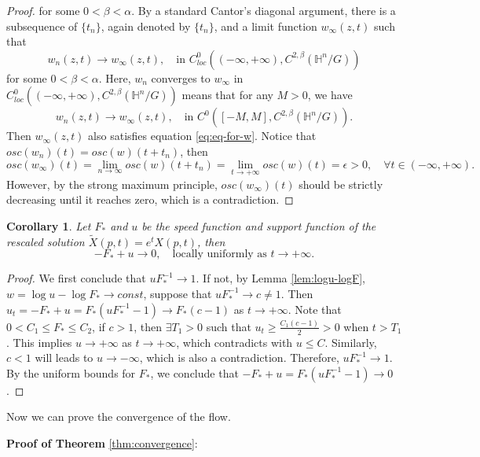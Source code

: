 \documentclass[10pt,a4paper]{amsart}
\newtheorem{corollary}[theorem]{Corollary}
\renewcommand{\H}{{\mathbb{H}}}
\numberwithin{equation}{section}
\begin{document}
\begin{proof}
    for some \(0 < \beta < \alpha\). By a standard Cantor's diagonal argument, there is a subsequence of \(\{t_n\}\), again denoted by \(\{t_n\}\), and a limit function \(w_{\infty}(z,t)\) such that 
    \[ w_n(z,t) \to w_{\infty}(z,t), \quad \text{in }C_{loc}^{0}\left((-\infty,+\infty),C^{2,\beta}(\H^n / G)\right) \]
    for some \(0 < \beta < \alpha\). Here, \(w_n\) converges to \(w_{\infty}\) in \(C_{loc}^{0}\left((-\infty,+\infty),C^{2,\beta}(\H^n / G)\right)\) means that for any \(M > 0\), we have 
    \[ w_n(z,t) \to w_{\infty}(z,t), \quad \text{in }C^{0}\left([-M,M],C^{2,\beta}(\H^n / G)\right). \] 
    Then \(w_\infty(z,t)\) also satisfies equation \eqref{eq:eq-for-w}. Notice that \( osc(w_n)(t) = osc(w)(t+t_n)\), then 
    \[ osc(w_\infty)(t) = \lim_{n\to \infty}osc(w)(t+t_n) = \lim_{t\to +\infty}osc(w)(t) = \epsilon > 0, \quad \forall t\in (-\infty,+\infty). \]
    However, by the strong maximum principle, \(osc(w_\infty)(t)\) should be strictly decreasing until it reaches zero, which is a contradiction. 
\end{proof}


\begin{corollary}
    Let \(F_*\) and \(u\) be the speed function and support function of the rescaled solution \(\tilde{X}(p,t) = e^t X(p,t)\), then 
    \[ -F_* + u \to 0,\quad \text{locally uniformly as }t\to +\infty. \]
\end{corollary}
\begin{proof}
    We first conclude that \(u F_*^{-1} \to 1\). If not, by Lemma \ref{lem:logu-logF}, \(w = \log u - \log F_* \to const\), suppose that \(u F_*^{-1} \to c\neq 1\). Then \(u_t = -F_* + u = F_*(uF_*^{-1} - 1) \to F_*(c-1) \) as \(t \to +\infty\). Note that \(0 < C_1 \leq F_* \leq C_2\), if \(c > 1\), then \(\exists T_1 > 0\) such that \(u_t \geq \frac{C_1 (c-1)}{2} > 0 \) when \(t > T_1\). This implies \(u \to +\infty\) as \(t\to +\infty\), which contradicts with \(u \leq C\). Similarly, \(c < 1\) will leads to \(u \to -\infty\), which is also a contradiction. Therefore, \(u F_*^{-1} \to 1\). By the uniform bounds for \(F_*\), we conclude that \(-F_* + u = F_*(uF_*^{-1} - 1) \to 0\).
\end{proof}

Now we can prove the convergence of the flow. \par

\textbf{Proof of Theorem }{\ref{thm:convergence}}: 
\end{document}

